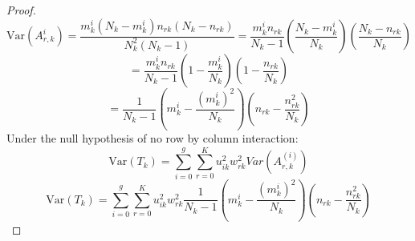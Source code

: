 \documentclass[12pt,oneside]{report}
\theoremstyle{definition}
\theoremstyle{mystyle}
\begin{document}
\begin{proof}
	\vspace{4mm}
	\begin{equation*}
	\text{Var}(A_{r,k}^{i})=\displaystyle \frac{m_{k}^{i}(N_{k}-m_{k}^{i})n_{rk}(N_{k}-n_{rk})}{N^{2}_{k}(N_{k}-1)}=\frac{m_{k}^{i}n_{rk}}{N_{k}-1}\left(\frac{N_{k}-m_{k}^{i}}{N_{k}}\right)\left(\frac{N_{k}-n_{rk}}{N_{k}}\right)
	\end{equation*}
	\vspace{4mm}
	\begin{equation*}
=	\displaystyle\frac{m_{k}^{i}n_{rk}}{N_{k}-1}\left(1-\frac{m_{k}^{i}}{N_{k}}\right)\left(1-\frac{n_{rk}}{N_{k}}\right)
	\end{equation*}
	\vspace{4mm}
	\begin{equation*}
=	\displaystyle\frac{1}{N_{k}-1}\left(m_{k}^{i}-\frac{(m_{k}^{i})^2}{N_{k}}\right)\left(n_{rk}-\frac{n_{rk}^2}{N_{k}}\right)
	\end{equation*}
	\vspace{4mm}
	Under the null hypothesis of no row by column interaction:\\
	\vspace{4mm}
	\begin{equation*}
\text{Var}(T_{k})=\displaystyle\sum\limits_{i=0}^{g}\sum\limits_{r=0}^{K}u_{ik}^2w_{rk}^2Var(A_{r,k}^{(i)})
	\end{equation*}
	\vspace{4mm}
	\begin{equation*}
	\text{Var}(T_{k})=\displaystyle\sum\limits_{i=0}^{g}\sum\limits_{r=0}^{K}u_{ik}^2w_{rk}^2\frac{1}{N_{k}-1}\left(m_{k}^{i}-\frac{(m_{k}^{i})^2}{N_{k}}\right)\left(n_{rk}-\frac{n_{rk}^2}{N_{k}}\right)
	\end{equation*}


\end{proof}
\end{document}
